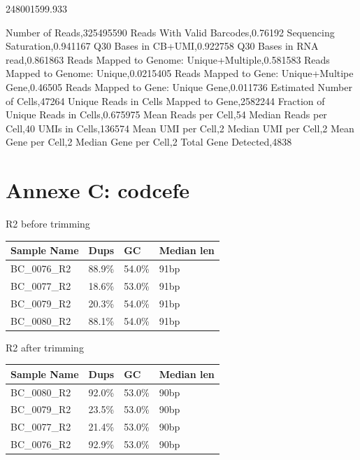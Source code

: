 \documentclass[
  11pt,
  a4paper,
]{report}
\begin{document}
248001599.933

Number of Reads,325495590 Reads With Valid Barcodes,0.76192 Sequencing
Saturation,0.941167 Q30 Bases in CB+UMI,0.922758 Q30 Bases in RNA
read,0.861863 Reads Mapped to Genome: Unique+Multiple,0.581583 Reads
Mapped to Genome: Unique,0.0215405 Reads Mapped to Gene: Unique+Multipe
Gene,0.46505 Reads Mapped to Gene: Unique Gene,0.011736 Estimated Number
of Cells,47264 Unique Reads in Cells Mapped to Gene,2582244 Fraction of
Unique Reads in Cells,0.675975 Mean Reads per Cell,54 Median Reads per
Cell,40 UMIs in Cells,136574 Mean UMI per Cell,2 Median UMI per Cell,2
Mean Gene per Cell,2 Median Gene per Cell,2 Total Gene Detected,4838

\chapter{Annexe C: codcefe}\label{annexe-c}

R2 before trimming

\begin{table}

\caption{\label{tbl-example}R1 before trimming}

\begin{minipage}{\linewidth}

\begin{longtable}[]{@{}llll@{}}
\toprule\noalign{}
Sample Name & Dups & GC & Median len \\
\midrule\noalign{}
\endhead
\bottomrule\noalign{}
\endlastfoot
BC\_0076\_R2 & 88.9\% & 54.0\% & 91bp \\
BC\_0077\_R2 & 18.6\% & 53.0\% & 91bp \\
BC\_0079\_R2 & 20.3\% & 54.0\% & 91bp \\
BC\_0080\_R2 & 88.1\% & 54.0\% & 91bp \\
\end{longtable}

\end{minipage}%

\end{table}%

R2 after trimming

\begin{table}

\caption{\label{tbl-example}R1 after trimming}

\begin{minipage}{\linewidth}

\begin{longtable}[]{@{}llll@{}}
\toprule\noalign{}
Sample Name & Dups & GC & Median len \\
\midrule\noalign{}
\endhead
\bottomrule\noalign{}
\endlastfoot
BC\_0080\_R2 & 92.0\% & 53.0\% & 90bp \\
BC\_0079\_R2 & 23.5\% & 53.0\% & 90bp \\
BC\_0077\_R2 & 21.4\% & 53.0\% & 90bp \\
BC\_0076\_R2 & 92.9\% & 53.0\% & 90bp \\
\end{longtable}

\end{minipage}%

\end{table}%
\end{document}
